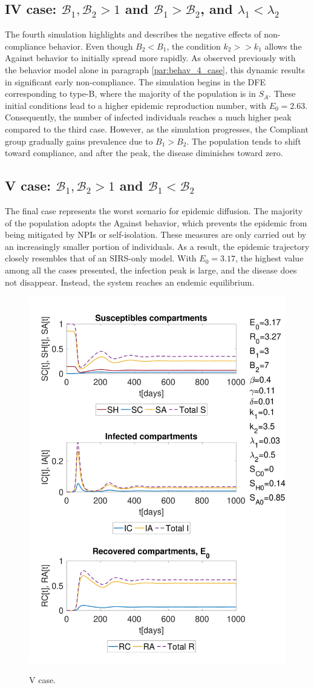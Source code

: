 \subsection{IV case:  $\mathcal{B}_1, \mathcal{B}_2 >1$ and $\mathcal{B}_1 >  \mathcal{B}_2$, and $\lambda_1 < \lambda_2$}
The fourth simulation highlights and describes the negative effects of non-compliance behavior. Even though $B_2 < B_1$, the condition $k_2 >> k_1$ allows the Against behavior to initially spread more rapidly. As observed previously with the behavior model alone in paragraph \ref{par:behav_4_case}, this dynamic results in significant early non-compliance. The simulation begins in the DFE corresponding to type-B, where the majority of the population is in $S_A$. These initial conditions lead to a higher epidemic reproduction number, with $E_0 = 2.63$. Consequently, the number of infected individuals reaches a much higher peak compared to the third case.
However, as the simulation progresses, the Compliant group gradually gains prevalence due to $B_1 > B_2$. The population tends to shift toward compliance, and after the peak, the disease diminishes toward zero.

\subsection{V case:  $\mathcal{B}_1, \mathcal{B}_2 >1$ and $\mathcal{B}_1 <  \mathcal{B}_2$}
The final case represents the worst scenario for epidemic diffusion. The majority of the population adopts the Against behavior, which prevents the epidemic from being mitigated by NPIs or self-isolation. These measures are only carried out by an increasingly smaller portion of individuals. As a result, the epidemic trajectory closely resembles that of an SIRS-only model. With $E_0 = 3.17$, the highest value among all the cases presented, the infection peak is large, and the disease does not disappear. Instead, the system reaches an endemic equilibrium.

\begin{figure}[h]
	\centering
	{\includegraphics[width=0.5\linewidth]{1_corpo/figure/behav_epi_sim/E_0_model_3epi_behav_sim_B2_mag_B1}} 
	\caption[Full model simulation figure third]{V case.}
	\label{fig:sim_B1_less_B2}
\end{figure}

